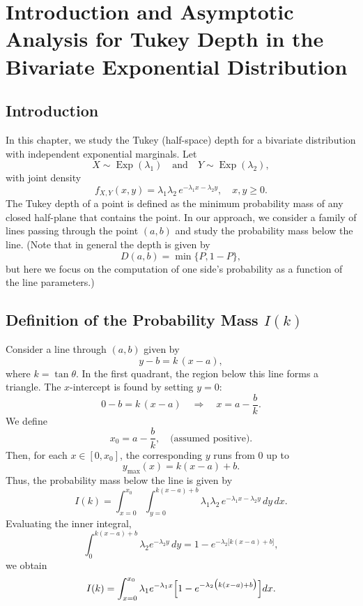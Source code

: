 \chapter{Introduction and Asymptotic Analysis for Tukey Depth in the Bivariate Exponential Distribution}

\section{Introduction}

In this chapter, we study the Tukey (half-space) depth for a bivariate distribution with independent exponential marginals. Let
\[
X \sim \operatorname{Exp}(\lambda_1) \quad\text{and}\quad Y \sim \operatorname{Exp}(\lambda_2),
\]
with joint density
\[
f_{X,Y}(x,y)=\lambda_1\lambda_2 \, e^{-\lambda_1 x-\lambda_2 y},\quad x,y \ge 0.
\]
The Tukey depth of a point is defined as the minimum probability mass of any closed half-plane that contains the point. In our approach, we consider a family of lines passing through the point $(a,b)$ and study the probability mass below the line. (Note that in general the depth is given by 
\[
D(a,b)=\min\{P,1-P\},
\]
but here we focus on the computation of one side's probability as a function of the line parameters.)

\section{Definition of the Probability Mass \( I(k) \)}

Consider a line through $(a,b)$ given by
\begin{equation}\label{eq:line}
  y - b = k \, (x - a),
\end{equation}
where \( k = \tan\theta \). In the first quadrant, the region below this line forms a triangle. The \(x\)-intercept is found by setting \( y = 0 \):
\[
0 - b = k\,(x-a) \quad \Longrightarrow \quad x = a - \frac{b}{k}.
\]
We define
\[
x_0 = a - \frac{b}{k}, \quad \text{(assumed positive)}.
\]
Then, for each \( x \in [0, x_0] \), the corresponding \( y \) runs from 0 up to
\[
y_{\max}(x) = k(x-a)+b.
\]
Thus, the probability mass below the line is given by
\begin{equation}\label{eq:Ik}
  I(k) = \int_{x=0}^{x_0} \int_{y=0}^{k(x-a)+b} \lambda_1 \lambda_2 \, e^{-\lambda_1 x-\lambda_2 y} \, dy\, dx.
\end{equation}
Evaluating the inner integral,
\[
\int_{0}^{k(x-a)+b} \lambda_2 e^{-\lambda_2 y} \, dy = 1 - e^{-\lambda_2\bigl[k(x-a)+b\bigr]},
\]
we obtain
\begin{equation}\label{eq:Ik2}
  I(k) = \int_{x=0}^{x_0} \lambda_1 e^{-\lambda_1 x} \Bigl[ 1 - e^{-\lambda_2\bigl(k(x-a)+b\bigr)} \Bigr] dx.
\end{equation}


